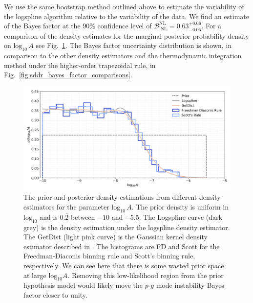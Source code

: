 We use the same bootstrap method outlined above to estimate the variability of the logspline algorithm relative to the variability of the data. We find an estimate of the Bayes factor at the $90\%$ confidence level of $\mathcal{B}^{\mathrm{NL}}_{!\mathrm{NL}} = 0.63^{+0.06}_{-0.05}$. For a comparison of the density estimates for the marginal posterior probability density on $\mathrm{log}_{10} \, A$ see Fig.~\ref{fig:density_estimators}. The Bayes factor uncertainty distribution is shown, in comparison to the other density estimators and the thermodynamic integration method under the higher-order trapezoidal rule, in Fig.~\ref{fig:sddr_bayes_factor_comparisons}.

\begin{figure}[th]
\centering
\includegraphics[width=1.0\textwidth]{figs/chapter6/prior_posterior_sddr.png}
\caption{The prior and posterior density estimations from different density estimators for the parameter $\mathrm{log}_{10} \, A$. The prior density is uniform in $\mathrm{log}_{10}$ and is $0.\overbar{2}$ between $-10$ and $-5.5$. The Logspline curve (dark grey) is the density estimation under the logspline density estimator. The GetDist (light pink curve) is the Gaussian kernel density estimator described in \cite{lewis2015getdist}. The histograms are FD and Scott for the Freedman-Diaconis binning rule and Scott's binning rule, respectively. We can see here that there is some wasted prior space at large $\mathrm{log}_{10} A$. Removing this low-likelihood region from the prior hypothesis model would likely move the $p$-$g$ mode instability Bayes factor closer to unity.}
\label{fig:density_estimators}
\end{figure}

